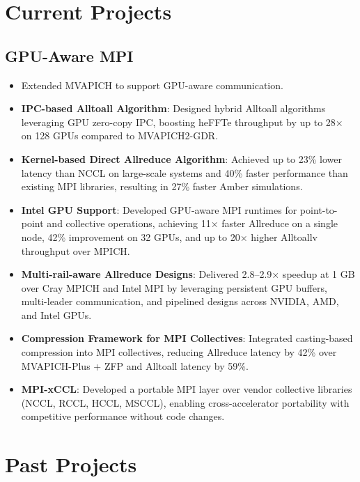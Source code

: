 \documentclass[10pt,a4paper,sans]{moderncv}          %
\begin{document}

\vspace*{-3mm}
\section{Current Projects}

\subsection{GPU-Aware MPI~\cite{isc26-rsa, ipdps26-casting, icpp25-allreduce, ipdps25-kernel, hipc24-intelgpu, pearc24-intelgpu, ipdrm23-xccl, ccgrid23-intelgpu, hcw22-alltoall}}
\begin{itemize}
    \item Extended MVAPICH to support GPU-aware communication.
    \item \textbf{IPC-based Alltoall Algorithm}: Designed hybrid Alltoall algorithms leveraging GPU zero-copy IPC, boosting heFFTe throughput by up to 28× on 128 GPUs compared to MVAPICH2-GDR.
    \item \textbf{Kernel-based Direct Allreduce Algorithm}: Achieved up to 23\% lower latency than NCCL on large-scale systems and 40\% faster performance than existing MPI libraries, resulting in 27\% faster Amber simulations.
    \item \textbf{Intel GPU Support}: Developed GPU-aware MPI runtimes for point-to-point and collective operations, achieving 11× faster Allreduce on a single node, 42\% improvement on 32 GPUs, and up to 20× higher Alltoallv throughput over MPICH.
    \item \textbf{Multi-rail-aware Allreduce Designs}: Delivered 2.8–2.9× speedup at 1 GB over Cray MPICH and Intel MPI by leveraging persistent GPU buffers, multi-leader communication, and pipelined designs across NVIDIA, AMD, and Intel GPUs.
    \item \textbf{Compression Framework for MPI Collectives}: Integrated casting-based compression into MPI collectives, reducing Allreduce latency by 42\% over MVAPICH-Plus + ZFP and Alltoall latency by 59\%.
    \item \textbf{MPI-xCCL}: Developed a portable MPI layer over vendor collective libraries (NCCL, RCCL, HCCL, MSCCL), enabling cross-accelerator portability with competitive performance without code changes.
\end{itemize}

\section{Past Projects}
\end{document}
